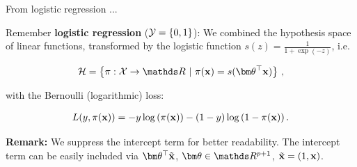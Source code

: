 \documentclass[11pt,compress,t,notes=noshow, xcolor=table]{beamer}
\begin{document}
    

\begin{vbframe}{From logistic regression ...}

Remember \textbf{logistic regression} ($\mathcal{Y} = \{0, 1\}$): We combined the hypothesis space of linear functions, transformed by the logistic function $s(z) = \frac{1}{1 + \exp(- z)}$, i.e.\

\vspace*{-0.3cm}

\begin{eqnarray*}
  \Hspace = \left\{\pi: \Xspace \to \R ~|~\pix = s(\thetav^\top \xv)\right\}\,,
\end{eqnarray*}

with the Bernoulli (logarithmic) loss: 

\begin{eqnarray*}
  L(y, \pi(\mathbf{x})) = -y \log \left(\pi(\mathbf{x})\right) - (1 - y) \log \left(1 - \pi(\mathbf{x})\right).
\end{eqnarray*}

\vfill

\begin{footnotesize}
  \textbf{Remark:} We suppress the intercept term for better readability. The intercept term can be easily included via $\thetav^\top \tilde\xv$, $\thetav \in \R^{p + 1}$, $\tilde{\mathbf{x}} = (1, \mathbf{x})$.
\end{footnotesize}

\end{vbframe}
\end{document}

